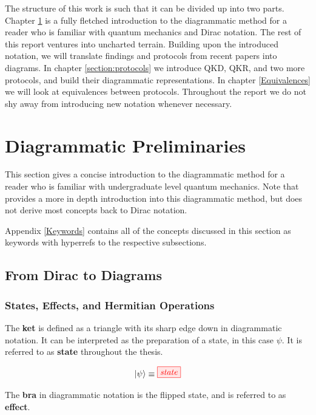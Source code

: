 \documentclass[]{article}
\begin{document}
The structure of this work is such that it can be divided up into two parts. Chapter \ref{section:preliminaries} is a fully fletched introduction to the diagrammatic method for a reader who is familiar with quantum mechanics and Dirac notation. The rest of this report ventures into uncharted terrain. Building upon the introduced notation, we will translate findings and protocols from recent papers into diagrams. In chapter \ref{section:protocols} we introduce QKD, QKR, and two more protocols, and build their diagrammatic representations. In chapter \ref{Equivalences} we will look at equivalences between protocols. Throughout the report we do not shy away from introducing new notation whenever necessary.
 
\section{Diagrammatic Preliminaries}
\label{section:preliminaries}

This section gives a concise introduction to the diagrammatic method for a reader who is familiar with undergraduate level quantum mechanics. Note that \cite{Coecke2017} provides a more in depth introduction into this diagrammatic method, but does not derive most concepts back to Dirac notation. 

Appendix \ref{Keywords} contains all of the concepts discussed in this section as keywords with hyperrefs to the respective subsections.

\subsection{From Dirac to Diagrams}

\subsubsection{States, Effects, and Hermitian Operations}

\label{braandket}
The \textbf{ket} is defined as a triangle with its sharp edge down in diagrammatic notation. It can be interpreted as the preparation of a state, in this case $\psi$. It is referred to as \textbf{state} throughout the thesis.

\begin{equation}
\label{equation:state}
\ket{\psi} \equiv \tikzfig{state}
\end{equation}

The \textbf{bra} in diagrammatic notation is the flipped state, and is referred to as \textbf{effect}. 
\end{document}
